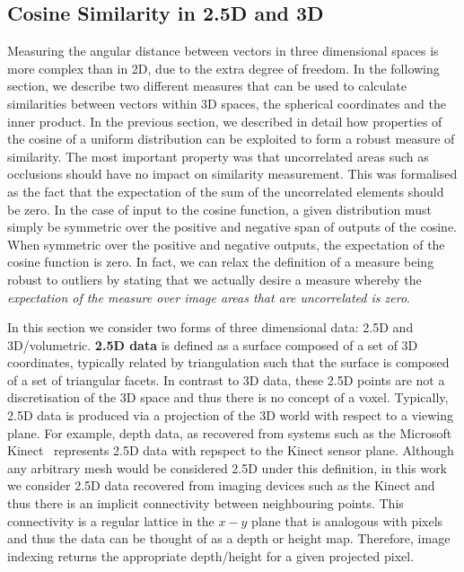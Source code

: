 \subsection{Cosine Similarity in 2.5D and 3D}\label{subsec:cosine_3d}
Measuring the angular distance between vectors in three dimensional spaces
is more complex than in 2D, due to the extra degree of freedom. In the following
section, we describe two different measures that can be used to calculate
similarities between vectors within 3D spaces, the spherical coordinates and the
inner product. In the previous section, we described in detail how properties of
the cosine of a uniform distribution can be exploited to form a robust measure
of similarity. The most important property was that uncorrelated areas such as
occlusions should have no impact on similarity measurement. This was formalised
as the fact that the expectation of the sum of the uncorrelated elements should
be zero. In the case of input to the cosine function, a given distribution must
simply be symmetric over the positive and negative span of outputs of the
cosine. When symmetric over the positive and negative outputs, the expectation
of the cosine function is zero. In fact, we can relax the definition of a
measure being robust to outliers by stating that we actually desire a measure
whereby the \textit{expectation of the measure over image areas that are
uncorrelated is zero}.

In this section we consider two forms of three dimensional
data: 2.5D and 3D/volumetric. \textbf{2.5D data} is defined as a surface composed
of a set of 3D coordinates, typically related by triangulation such that
the surface is composed of a set of triangular facets. In contrast to 3D data,
these 2.5D points are not a discretisation of the 3D space and thus there
is no concept of a voxel. Typically, 2.5D data is produced via a projection
of the 3D world with respect to a viewing plane. For example, depth data, as
recovered from systems such as the Microsoft Kinect~\cite{zhang2012microsoft}
represents 2.5D data with repspect to the Kinect sensor plane. Although any
arbitrary mesh would be considered 2.5D under this definition, in this work
we consider 2.5D data recovered from imaging devices such as the Kinect and thus
there is an implicit connectivity between neighbouring points. This connectivity
is a regular lattice in the $x-y$ plane that is analogous with pixels and thus
the data can be thought of as a depth or height map. Therefore, image indexing
returns the appropriate depth/height for a given projected pixel.

